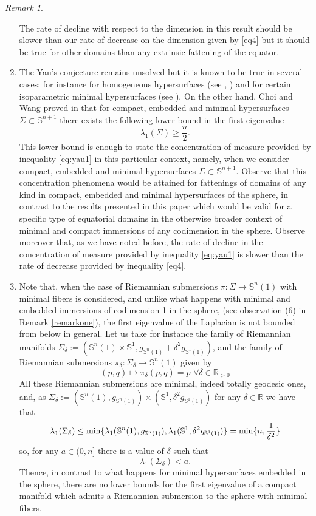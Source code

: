\documentclass{amsart}
\theoremstyle{definition}
\theoremstyle{remark}
\newtheorem{remark}[theorem]{Remark}
\newcommand{\erre}{\mathbb{R}}
\newcommand{\ese}{\mathbb{S}}
\begin{document}
\begin{remark}
\begin{enumerate}
The rate of decline with respect to the dimension in this result  should be slower than our rate of decrease on the dimension given by \eqref{eq4} but it should be true for other domains than any extrinsic fattening of the equator.
\medskip

\item The Yau's conjecture remains unsolved but it is known to be true in several  cases: for instance for homogeneous hypersurfaces (see \cite{MR0742598}, \cite{MR0814078}) and for certain isoparametric minimal hypersurfaces (see \cite{MR3080491}).   On the other hand, Choi and Wang proved in \cite{Choi1983559} that for compact, embedded  and minimal hypersurfaces $\Sigma\subset\mathbb{S}^{n+1}$ there exists the following lower bound in the first eigenvalue
$$\lambda_1(\Sigma)\geq \frac{n}{2}.$$
This lower bound is enough to state the concentration of measure provided by inequality \eqref{eq:yau1} in this particular context, namely, when we consider compact, embedded  and minimal hypersurfaces $\Sigma\subset\mathbb{S}^{n+1}$. Observe  that this concentration phenomena would be attained for fattenings of domains of any kind in compact, embedded and minimal hypersurfaces of the sphere, in contrast to the results presented in this paper which would be valid for a specific type of equatorial domains in the otherwise broader context of minimal and compact immersions of any codimension in the sphere. Observe moreover that, as we have noted before, the  rate of decline in the concentration of measure provided by inequality \eqref{eq:yau1}  is slower than the rate of decrease provided  by  inequality \eqref{eq4}.
\item Note that, when the case of Riemannian submersions $\pi: \Sigma \rightarrow \ese^n(1)$ with minimal fibers is considered, and unlike what happens with minimal and embedded immersions of codimension 1 in the sphere, (see observation (6) in Remark \ref{remarkone}), the first eigenvalue of the Laplacian is not bounded from below in general. 
Let us take for instance the family of Riemannian manifolds $\Sigma_\delta:=(\mathbb{S}^n(1)\times \mathbb{S}^1, g_{\mathbb{S}^{n}(1)}+\delta^2 g_{\mathbb{S}^{1}(1)})$, and the family of Riemannian submersions $\pi_\delta: \Sigma_\delta \rightarrow \ese^n(1)$ given by
$$
(p,q)\mapsto \pi_\delta(p,q)=p \,\,\forall \delta \in \erre_{>0}
$$
All these Riemannian submersions are minimal, indeed totally geodesic ones, and, as $\Sigma_\delta:=(\mathbb{S}^n(1),g_{\mathbb{S}^{n}(1)}) \times (\mathbb{S}^1,\delta^2g_{\mathbb{S}^{1}(1)})$  for any $\delta \in \erre$ we have that
$$\lambda_1(\Sigma_\delta)\leq {\rm min}\{\lambda_1(\mathbb{S}^n(1),g_{\mathbb{S}^{n}(1)}),\lambda_1(\mathbb{S}^1,\delta^2g_{\mathbb{S}^{1}(1)})\}={\rm min}\{n, \frac{1}{\delta^2}\}$$
\noindent so, for any $a\in (0,n]$ there is a value of $\delta$ such that
$$
\lambda_1(\Sigma_\delta)<a.
$$
Thence, in contrast to what happens for minimal hypersurfaces embedded in the sphere, there are no lower bounds for the first eigenvalue of a compact manifold which admits a Riemannian submersion to the sphere with minimal fibers.
\end{enumerate}
\end{remark}
\end{document}
